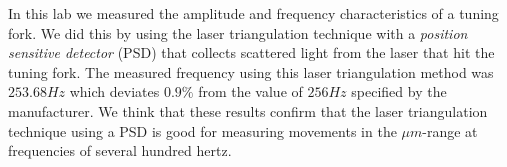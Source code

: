 In this lab we measured the amplitude and frequency characteristics of a tuning fork.
We did this by using the laser triangulation technique with a \emph{position sensitive detector} (PSD)
that collects scattered light from the laser that hit the tuning fork.
The measured frequency using this laser triangulation method was $253.68Hz$ which deviates $0.9\%$
from the value of $256Hz$ specified by the manufacturer.
We think that these results confirm that the laser triangulation technique using a PSD is good for measuring movements in the $\mu m$-range at frequencies of several hundred hertz.
